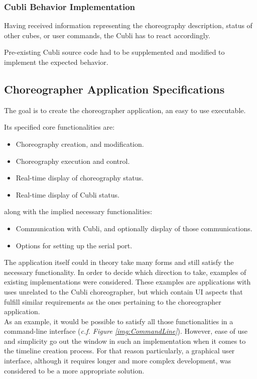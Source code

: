 \subsubsection{Cubli Behavior Implementation}

Having received information representing the choreography description, status of other cubes, or user commands, the Cubli has to react accordingly.

Pre-existing Cubli source code had to be supplemented and modified to implement the expected behavior.




\subsection{Choreographer Application Specifications}

The goal is to create the choreographer application, an easy to use executable.

Its specified core functionalities are:

\begin{itemize}
\item Choreography creation, and modification.
\item Choreography execution and control.
\item Real-time display of choreography status.
\item Real-time display of Cubli status.
\end{itemize}

along with the implied necessary functionalities:

\begin{itemize}
\item Communication with Cubli, and optionally display of those communications.
\item Options for setting up the serial port.
\end{itemize}


The application itself could in theory take many forms and still satisfy the necessary functionality. In order to decide which direction to take, examples of existing implementations were considered. These examples are applications with uses unrelated to the Cubli choreographer, but which contain UI aspects that fulfill similar requirements as the ones pertaining to the choreographer application.\\

As an example, it would be possible to satisfy all those functionalities in a command-line interface (\textit{c.f. Figure \ref{img:CommandLine}}). However, ease of use and simplicity go out the window in such an implementation when it comes to the timeline creation process. For that reason particularly, a graphical user interface, although it requires longer and more complex development, was considered to be a more appropriate solution.\\

